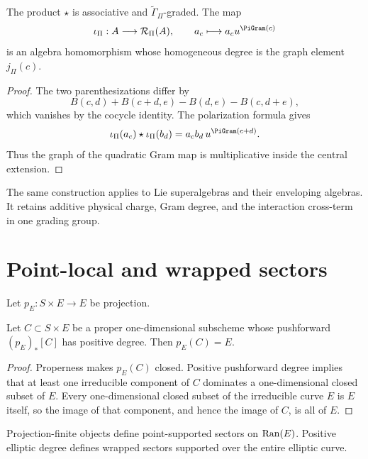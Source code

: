 \begin{theorem}
The product $\star$ is associative and $\widetilde\Gamma_\Pi$-graded. The map
\[
 \iota_\Pi:A\longrightarrow\mathcal R_\Pi(A),
 \qquad a_c\longmapsto a_cu^{\PiGram(c)}
\]
is an algebra homomorphism whose homogeneous degree is the graph element $j_\Pi(c)$.
\end{theorem}
\begin{proof}
The two parenthesizations differ by
\[
 B(c,d)+B(c+d,e)-B(d,e)-B(c,d+e),
\]
which vanishes by the cocycle identity. The polarization formula gives
\[
 \iota_\Pi(a_c)\star\iota_\Pi(b_d)
 =a_cb_d\,u^{\PiGram(c+d)}.
\]
Thus the graph of the quadratic Gram map is multiplicative inside the central extension.
\end{proof}

The same construction applies to Lie superalgebras and their enveloping algebras. It retains additive physical charge, Gram degree, and the interaction cross-term in one grading group.

\chapter{Point-local and wrapped sectors}
Let $p_E:S\times E\to E$ be projection.

\begin{lemma}
Let $C\subset S\times E$ be a proper one-dimensional subscheme whose pushforward $(p_E)_*[C]$ has positive degree. Then $p_E(C)=E$.
\end{lemma}
\begin{proof}
Properness makes $p_E(C)$ closed. Positive pushforward degree implies that at least one irreducible component of $C$ dominates a one-dimensional closed subset of $E$. Every one-dimensional closed subset of the irreducible curve $E$ is $E$ itself, so the image of that component, and hence the image of $C$, is all of $E$.
\end{proof}

Projection-finite objects define point-supported sectors on $\operatorname{Ran}(E)$. Positive elliptic degree defines wrapped sectors supported over the entire elliptic curve.

